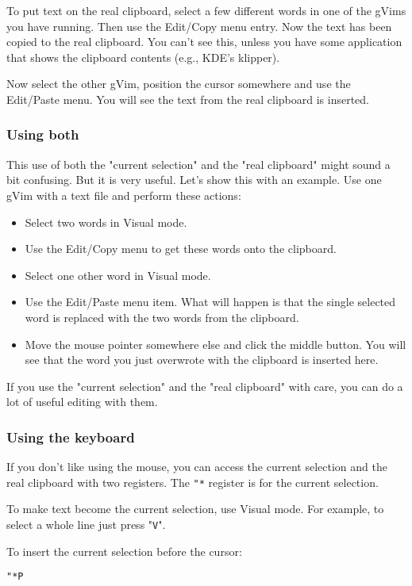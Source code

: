 To put text on the real clipboard, select a few different words in one of the gVims you have running.
Then use the Edit/Copy menu entry.
Now the text has been copied to the real clipboard.
You can't see this, unless you have some application that shows the clipboard contents (e.g., KDE's klipper).

Now select the other gVim, position the cursor somewhere and use the Edit/Paste menu.
You will see the text from the real clipboard is inserted.
\subsubsection{Using both}
This use of both the "current selection" and the "real clipboard" might sound a bit confusing.
But it is very useful.
Let's show this with an example.
Use one gVim with a text file and perform these actions:

\begin{itemize}
				\item Select two words in Visual mode.
				\item Use the Edit/Copy menu to get these words onto the clipboard.
				\item Select one other word in Visual mode.
				\item Use the Edit/Paste menu item.
								What will happen is that the single selected word is replaced with the two words from the clipboard.
				\item Move the mouse pointer somewhere else and click the middle button.
								You will see that the word you just overwrote with the clipboard is inserted here.
\end{itemize}

If you use the "current selection" and the "real clipboard" with care, you can do a lot of useful editing with them.
\subsubsection{Using the keyboard}

If you don't like using the mouse, you can access the current selection and the real clipboard with two registers.
The \texttt{"*} register is for the current selection.

To make text become the current selection, use Visual mode.
For example, to select a whole line just press "\texttt{V}".

To insert the current selection before the cursor:

 \begin{Verbatim}[samepage=true]
 "*P
 \end{Verbatim}


